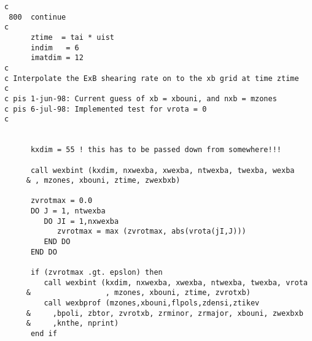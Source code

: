 \begin{verbatim}
c
 800  continue
c
      ztime  = tai * uist
      indim   = 6
      imatdim = 12
c
c Interpolate the ExB shearing rate on to the xb grid at time ztime
c
c pis 1-jun-98: Current guess of xb = xbouni, and nxb = mzones
c pis 6-jul-98: Implemented test for vrota = 0
c


      kxdim = 55 ! this has to be passed down from somewhere!!!

      call wexbint (kxdim, nxwexba, xwexba, ntwexba, twexba, wexba
     & , mzones, xbouni, ztime, zwexbxb)

      zvrotmax = 0.0
      DO J = 1, ntwexba
         DO JI = 1,nxwexba
            zvrotmax = max (zvrotmax, abs(vrota(jI,J)))
         END DO
      END DO

      if (zvrotmax .gt. epslon) then
         call wexbint (kxdim, nxwexba, xwexba, ntwexba, twexba, vrota
     &                 , mzones, xbouni, ztime, zvrotxb)
         call wexbprof (mzones,xbouni,flpols,zdensi,ztikev
     &     ,bpoli, zbtor, zvrotxb, zrminor, zrmajor, xbouni, zwexbxb
     &     ,knthe, nprint)
      end if 


\end{verbatim}
